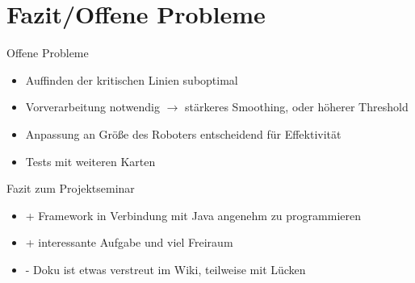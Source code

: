 \section{Fazit/Offene Probleme}
\begin{frame}{Offene Probleme}
  \begin{itemize}
   \item Auffinden der kritischen Linien suboptimal
   \item Vorverarbeitung notwendig $\to$ stärkeres Smoothing, oder höherer Threshold
   \item Anpassung an Größe des Roboters entscheidend für Effektivität
   \item Tests mit weiteren Karten
  \end{itemize}
\end{frame}
\begin{frame}{Fazit zum Projektseminar}
  \begin{itemize}
   \item + Framework in Verbindung mit Java angenehm zu programmieren
   \item + interessante Aufgabe und viel Freiraum
   \item - Doku ist etwas verstreut im Wiki, teilweise mit Lücken
  \end{itemize}
\end{frame}
